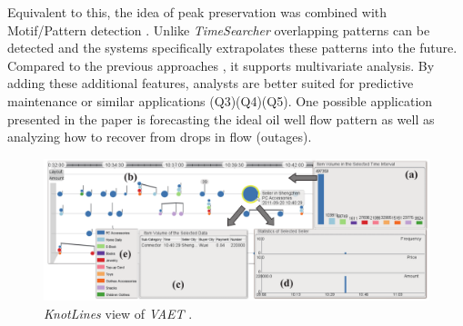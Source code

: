 \documentclass[electronic]{vgtc}             %
\begin{document}
Equivalent to this, the idea of peak preservation \cite{Hao:2009, Hao:2011} was combined with Motif/Pattern detection \cite{Hao:2012}.
Unlike \textit{TimeSearcher} \cite{buono:2007} overlapping patterns can be detected and the systems specifically extrapolates these patterns into the future.
Compared to the previous approaches \cite{Hao:2009, Hao:2011}, it supports multivariate analysis. 
By adding these additional features, analysts are better suited for predictive maintenance or similar applications (Q3)(Q4)(Q5). 
One possible application presented in the paper is forecasting the ideal oil well flow pattern as well as analyzing how to recover from drops in flow (outages).   

\begin{figure}[b]
	\centering
	\includegraphics[width=\columnwidth]{KnotLines}
	\caption{\textit{KnotLines} view of \textit{VAET} \cite{Xie:2014}. 
	}
	\label{fig:knotlines}
\end{figure}
\end{document}
